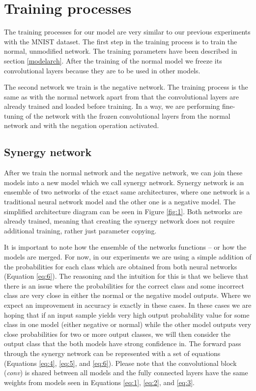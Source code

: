 \documentclass[b5paper]{book}
\let\cite\parencite
\begin{document}
\section{Training processes}
\label{datasettraining}

The training processes for our model are very similar to our previous experiments with the MNIST dataset. \cite{milovsevic2019classification} The first step in the training process is to train the normal, unmodified network. The training parameters have been described in section \ref{modelarch}. After the training of the normal model we freeze its convolutional layers because they are to be used in other models.

The second network we train is the negative network. The training process is the same as with the normal network apart from that the convolutional layers are already trained and loaded before training. In a way, we are performing fine-tuning of the network with the frozen convolutional layers from the normal network and with the negation operation activated. 



\subsection{Synergy network}
\label{synergy}



After we train the normal network and the negative network, we can join these models into a new model which we call synergy network. Synergy network is an ensemble of two networks of the exact same architectures, where one network is a traditional neural network model and the other one is a negative model. The simplified architecture diagram can be seen in Figure \ref{fig:1}. Both networks are already trained, meaning that creating the synergy network does not require additional training, rather just parameter copying. 

It is important to note how the ensemble of the networks functions -- or how the models are merged. For now, in our experiments we are using a simple addition of the probabilities for each class which are obtained from both neural networks (Equation \ref{eq:6}). The reasoning and the intuition for this is that we believe that there is an issue where the probabilities for the correct class and some incorrect class are very close in either the normal or the negative model outputs. Where we expect an improvement in accuracy is exactly in these cases. In these cases we are hoping that if an input sample yields very high output probability value for some class in one model (either negative or normal) while the other model outputs very close probabilities for two or more output classes, we will then consider the output class that the both models have strong confidence in. The forward pass through the synergy network can be represented with a set of equations (Equations \ref{eq:4}, \ref{eq:5}, and \ref{eq:6}). Please note that the convolutional block (\emph{conv}) is shared between all models and the fully connected layers have the same weights from models seen in Equations \ref{eq:1}, \ref{eq:2}, and \ref{eq:3}.
\end{document}
